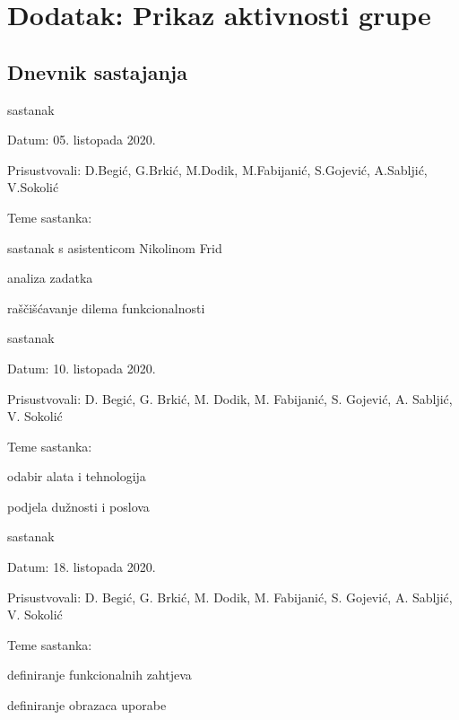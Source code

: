 \chapter*{Dodatak: Prikaz aktivnosti grupe}
		
		\section*{Dnevnik sastajanja}
		
		
		\begin{packed_enum}
			\item  sastanak
			
			\item[] \begin{packed_item}
				\item Datum: 05. listopada 2020.
				\item Prisustvovali: D.Begić, G.Brkić, M.Dodik, M.Fabijanić, S.Gojević, A.Sabljić, V.Sokolić
				\item Teme sastanka:
				\begin{packed_item}
					\item  sastanak s asistenticom Nikolinom Frid
					\item  analiza zadatka
					\item raščišćavanje dilema funkcionalnosti
				\end{packed_item}
			\end{packed_item}
			
			\item  sastanak
			\item[] \begin{packed_item}
				\item Datum: 10. listopada 2020.
				\item Prisustvovali: D. Begić, G. Brkić, M. Dodik, M. Fabijanić, S. Gojević, A. Sabljić, V. Sokolić
				\item Teme sastanka:
				\begin{packed_item}
					\item  odabir alata i tehnologija
					\item  podjela dužnosti i poslova
				\end{packed_item}
			\end{packed_item}
		
			\item  sastanak
			\item[] \begin{packed_item}
				\item Datum: 18. listopada 2020.
				\item Prisustvovali: D. Begić, G. Brkić, M. Dodik, M. Fabijanić, S. Gojević, A. Sabljić, V. Sokolić
				\item Teme sastanka:
				\begin{packed_item}
					\item  definiranje funkcionalnih zahtjeva
					\item  definiranje obrazaca uporabe
				\end{packed_item}
			\end{packed_item}
			

\end{packed_enum}
